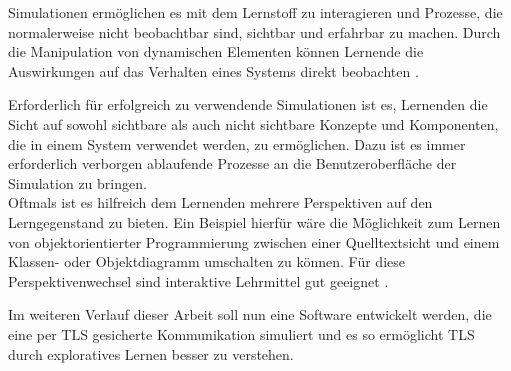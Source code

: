\begin{quote}
 \cite{niegemann08}
\end{quote}

Simulationen ermöglichen es mit dem Lernstoff zu interagieren und Prozesse, die normalerweise nicht beobachtbar sind, sichtbar und erfahrbar zu machen. Durch die Manipulation von dynamischen Elementen können Lernende die Auswirkungen auf das Verhalten eines Systems direkt beobachten \cite{niegemann08}.

Erforderlich für erfolgreich zu verwendende Simulationen ist es, Lernenden die Sicht auf sowohl sichtbare als auch nicht sichtbare Konzepte und Komponenten, die in einem System verwendet werden, zu ermöglichen. Dazu ist es immer erforderlich verborgen ablaufende Prozesse an die Benutzeroberfläche der Simulation zu bringen. \\
Oftmals ist es hilfreich dem Lernenden mehrere Perspektiven auf den Lerngegenstand zu bieten. Ein Beispiel hierfür wäre die Möglichkeit zum Lernen von objektorientierter Programmierung zwischen einer Quelltextsicht und einem Klassen- oder Objektdiagramm umschalten zu können. Für diese Perspektivenwechsel sind interaktive Lehrmittel gut geeignet \cite{schubert11}.

Im weiteren Verlauf dieser Arbeit soll nun eine Software entwickelt werden, die eine per TLS gesicherte Kommunikation simuliert und es so ermöglicht TLS durch exploratives Lernen besser zu verstehen.
